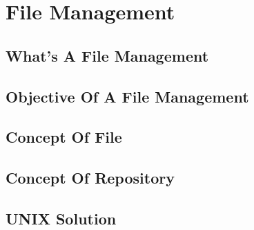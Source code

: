 \section{File Management}

\subsection{What's A File Management}

\subsection{Objective Of A File Management}

\subsection{Concept Of File}

\subsection{Concept Of Repository}

\subsection{UNIX Solution}
